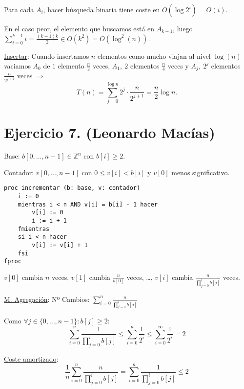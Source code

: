 \documentclass[10pt,a4paper,openright]{book}
\theoremstyle{break}
\begin{document}
Para cada $A_i$, hacer búsqueda binaria tiene coste en $O\left( \log 2^i \right) = O\left( i \right)$. 

En el caso peor, el elemento que buscamos está en $A_{k-1}$, luego $\sum_{i=0}^{k-1} i = \frac{\left( k-1 \right) k}{2} \in O\left( k^2 \right) = O\left( \log^2\left( n \right) \right)$.

\underline{Insertar}:
Cuando insertamos $n$ elementos como mucho viajan al nivel $\log\left( n \right)$ vaciamos $A_0$ de $1$ elemento $\frac{n}{2}$ veces, $A_1,\ 2$ elementos $\frac{n}{4}$ veces y $A_j,\ 2^j$ elementos $\frac{n}{2^{j+1}}$ veces $\Rightarrow$
\[
T\left( n \right) = \sum_{j=0}^{\log n} 2^j \cdot \frac{n}{2^{j+1}} = \frac{n}{2} \log n.
\]

\section{Ejercicio 7. (Leonardo Macías)}%
\label{sec:ejercicio_7}
Base: $b\left[ 0, \ldots, n-1 \right] \in \mathbb{Z}^n$ con $b\left[ i \right] \ge 2$.

Contador: $v\left[ 0, \ldots, n-1 \right]$ con $0 \le v\left[ i \right] < b\left[ i \right]$ y $v\left[ 0 \right]$ menos significativo.

\begin{lstlisting}
proc incrementar (b: base, v: contador) 
    i := 0
    mientras i < n AND v[i] = b[i] - 1 hacer
        v[i] := 0
        i := i + 1
    fmientras
    si i < n hacer
        v[i] := v[i] + 1
    fsi
fproc
\end{lstlisting}
$v\left[ 0 \right]$ cambia $n$ veces, $v\left[ 1 \right]$ cambia $\frac{n}{b\left[ 0 \right]}$ veces, \ldots, $v\left[ i \right]$ cambia $\frac{n}{\prod_{j=0}^{i} b\left[ j \right]}$ veces.

\underline{M. Agregación}: 
Nº Cambios: $\sum_{i=0}^{n} \frac{n}{\prod_{j=0}^{i} b\left[ j \right]}$

Como $\forall j \in \{0, \ldots, n-1\}: b\left[ j \right] \ge 2$:
\[
\sum_{i=0}^{n} \frac{1}{\prod_{j=0}^{i} b\left[ j \right]} \le \sum_{i=0}^{n} \frac{1}{2^i} \le \sum_{i=0}^{\infty} \frac{1}{2^i} = 2  
\]

\underline{Coste amortizado}:
\[
\frac{1}{n} \sum_{i=0}^{n} \frac{n}{\prod_{j=0}^{i} b\left[ j \right]} = \sum_{i=0}^{n} \frac{1}{\prod_{j=0}^{i} b\left[ j \right]} \le 2   
\]
\end{document}
